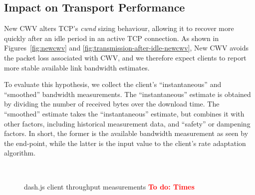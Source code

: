 \documentclass[10pt,sigconf,anonymous]{acmart}
\newcommand{\todo}[1]{\textbf{\textcolor{red}{To do: #1}}}
\begin{document}
\subsection{Impact on Transport Performance} 
\label{sec:transport-impact}

New CWV alters TCP's \emph{cwnd} sizing behaviour, allowing it to recover more quickly after an idle period in an active TCP connection. As shown in Figures~\ref{fig:newcwv} and \ref{fig:transmission-after-idle-newcwv}, New CWV avoids the packet loss associated with CWV, and we therefore expect clients to report more stable available link bandwidth estimates. 

To evaluate this hypothesis, we collect the client's ``instantaneous'' and ``smoothed'' bandwidth measurements. The ``instantaneous'' estimate is obtained by  dividing the number of received bytes over the download time. The ``smoothed'' estimate takes the ``instantaneous'' estimate, but combines it with other factors, including historical measurement data, and ``safety'' or dampening factors. In short, the former is the available bandwidth measurement as seen by the end-point, while the latter is the input value to the client's rate adaptation algorithm.

\begin{figure}[t!]
  \centering
  \\
  \caption{dash.js client throughput measurements \todo{Times}}
  \label{fig:throughput-clients}
\end{figure}
\end{document}

